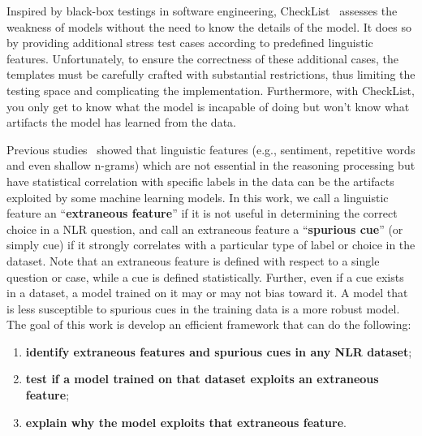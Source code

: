 

Inspired by black-box testings in software engineering, 
CheckList~\cite{checklist2020acl} assesses the weakness of 
models without the need to know the details of the model. It does so by
providing additional stress test cases according to predefined 
linguistic features. Unfortunately, to ensure the correctness of
these additional cases, the templates must be carefully crafted
with substantial restrictions, thus limiting the testing space and
complicating the implementation. 
Furthermore, with CheckList, you only get to know what the model 
is incapable of doing but won't know what artifacts
the model has learned from the data.


Previous studies~\cite{gururangan2018annotation,sanchez2018behavior,
poliak2018hypothesis} 
showed that linguistic features 
(e.g., sentiment, repetitive words and even shallow n-grams)
which are not essential in the reasoning processing but have
statistical correlation with specific labels in the data
can be the artifacts exploited by some machine learning models.
In this work, we call a linguistic feature an ``\textbf{extraneous feature}''
if it is not useful in determining the correct choice in a NLR question, 
and call an extraneous feature a ``\textbf{spurious cue}'' (or simply cue) if it strongly correlates 
with a particular type of label or choice in the dataset. 
Note that an extraneous feature is defined with respect to a single question or case,
while a cue is defined statistically.
Further, even if a cue exists in a dataset, a model trained on
it may or may not bias toward it. A model that is less susceptible to
spurious cues in the training data is a more robust model.
The goal of this work is develop an efficient framework that can do the following:
\begin{enumerate}[label=(\roman*)]
\item \textbf{identify extraneous features and spurious cues in any NLR dataset}; 
\item \textbf{test if a model trained on that dataset exploits an extraneous feature}; 
\item \textbf{explain why the model exploits that extraneous feature}.  
\end{enumerate}

